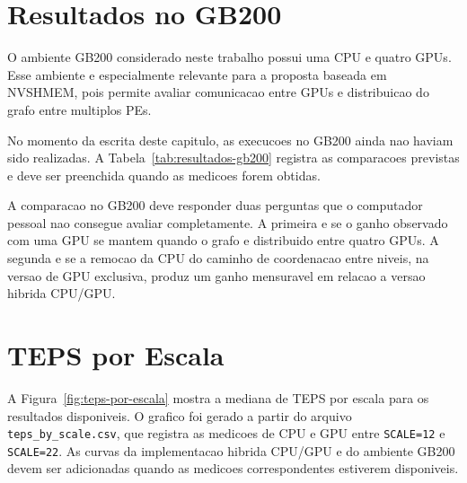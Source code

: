 \section{Resultados no GB200}

O ambiente GB200 considerado neste trabalho possui uma CPU e quatro GPUs. Esse
ambiente e especialmente relevante para a proposta baseada em NVSHMEM, pois permite
avaliar comunicacao entre GPUs e distribuicao do grafo entre multiplos PEs.

No momento da escrita deste capitulo, as execucoes no GB200 ainda nao haviam sido
realizadas. A Tabela~\ref{tab:resultados-gb200} registra as comparacoes previstas
e deve ser preenchida quando as medicoes forem obtidas.

\begin{table}[H]
\centering
{}
\caption{Resultados previstos para o ambiente GB200 com uma CPU e quatro GPUs. Os valores ainda estao pendentes.}
\label{tab:resultados-gb200}
\end{table}

A comparacao no GB200 deve responder duas perguntas que o computador pessoal nao
consegue avaliar completamente. A primeira e se o ganho observado com uma GPU se
mantem quando o grafo e distribuido entre quatro GPUs. A segunda e se a remocao da
CPU do caminho de coordenacao entre niveis, na versao de GPU exclusiva, produz um
ganho mensuravel em relacao a versao hibrida CPU/GPU.

\section{TEPS por Escala}

A Figura~\ref{fig:teps-por-escala} mostra a mediana de TEPS por escala para os
resultados disponiveis. O grafico foi gerado a partir do arquivo
\texttt{teps\_by\_scale.csv}, que registra as medicoes de CPU e GPU entre
\texttt{SCALE=12} e \texttt{SCALE=22}. As curvas da implementacao hibrida CPU/GPU
e do ambiente GB200 devem ser adicionadas quando as medicoes correspondentes
estiverem disponiveis.

